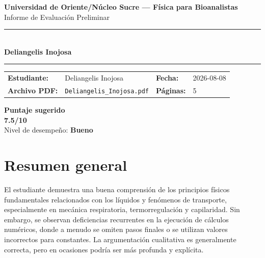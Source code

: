 \documentclass[11pt,a4paper]{article}
\begin{document}
\begin{center}
  {\Large\bfseries\color{azulTitulo} Universidad de Oriente/Núcleo Sucre --- Física para Bioanalistas}\\[4pt]
  {\large Informe de Evaluación Preliminar}\\[12pt]
  \rule{\linewidth}{1.2pt}\\[6pt]
  {\LARGE\bfseries Deliangelis Inojosa}\\[4pt]
  \rule{\linewidth}{0.6pt}
\end{center}

\vspace{4pt}
\begin{tcolorbox}[cajaTitulo, title=Datos del informe]
\begin{tabular}{@{}llll@{}}
  \textbf{Estudiante:}  & Deliangelis Inojosa  &
  \textbf{Fecha:}       & 2026-08-08 \\[4pt]
  \textbf{Archivo PDF:} & \texttt{Deliangelis\_Inojosa.pdf}  &
  \textbf{Páginas:}     & 5 \\
\end{tabular}
\end{tcolorbox}

\vspace{6pt}
\begin{center}
  \begin{tcolorbox}[
    enhanced,
    colback=white, colframe=desempeno_bueno,
    width=0.62\linewidth,
    boxrule=2pt,
    halign=center, valign=center,
    top=8pt, bottom=8pt,
  ]
    \centering
    {\large\bfseries Puntaje sugerido}\\[6pt]
    {\Huge\bfseries\color{desempeno_bueno} 7.5/10}\\[6pt]
    {\large Nivel de desempeño: \textbf{\color{desempeno_bueno} Bueno}}
  \end{tcolorbox}
\end{center}

\section*{Resumen general}
El estudiante demuestra una buena comprensión de los principios físicos fundamentales relacionados con los líquidos y fenómenos de transporte, especialmente en mecánica respiratoria, termorregulación y capilaridad. Sin embargo, se observan deficiencias recurrentes en la ejecución de cálculos numéricos, donde a menudo se omiten pasos finales o se utilizan valores incorrectos para constantes. La argumentación cualitativa es generalmente correcta, pero en ocasiones podría ser más profunda y explícita.
\end{document}
